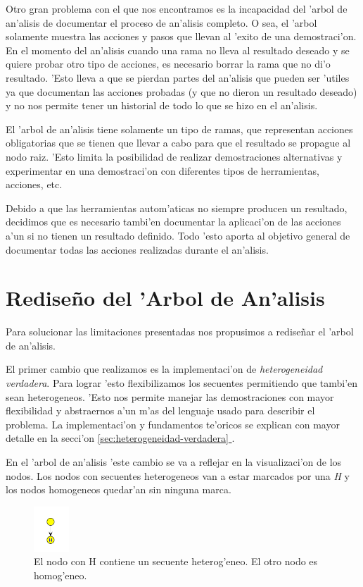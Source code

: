 Otro gran problema con el que nos encontramos es la incapacidad del 'arbol de an'alisis de documentar el proceso de an'alisis completo. O sea, el 'arbol solamente muestra las acciones y pasos que llevan al 'exito de una demostraci'on. En el momento del an'alisis cuando una rama no lleva al resultado deseado y se quiere probar otro tipo de acciones, es necesario borrar la rama que no di'o resultado. 'Esto lleva a que se pierdan partes del an'alisis que pueden ser 'utiles ya que documentan las acciones probadas (y que no dieron un resultado deseado) y no nos permite tener un historial de todo lo que se hizo en el an'alisis.

El 'arbol de an'alisis tiene solamente un tipo de ramas, que representan acciones obligatorias que se tienen que llevar a cabo para que el resultado se propague al nodo raiz. 'Esto limita la posibilidad de realizar demostraciones alternativas y experimentar en una demostraci'on con diferentes tipos de herramientas, acciones, etc.

Debido a que las herramientas autom'aticas no siempre producen un resultado, decidimos que es necesario tambi'en documentar la aplicaci'on de las acciones a'un si no tienen un resultado definido.   Todo 'esto aporta al objetivo general de documentar todas las acciones realizadas durante el an'alisis.


\section{Rediseño del 'Arbol de An'alisis}

Para solucionar las limitaciones presentadas nos propusimos a rediseñar el 'arbol de an'alisis.

El primer cambio que realizamos es la implementaci'on de \textit{heterogeneidad verdadera}.
Para lograr 'esto flexibilizamos los secuentes permitiendo que tambi'en sean heterogeneos. 'Esto nos permite manejar las demostraciones con mayor flexibilidad y abstraernos a'un m'as del lenguaje usado para describir el problema. La implementaci'on y fundamentos te'oricos se explican con mayor detalle en la secci'on \hyperref[sec:heterogeneidad-verdadera]{\ref*{sec:heterogeneidad-verdadera} }.

En el 'arbol de an'alisis 'este cambio se va a reflejar en la visualizaci'on de los nodos. Los nodos con secuentes heterogeneos van a estar marcados por una \textit{H} y los nodos homogeneos quedar'an sin ninguna marca.

\begin{figure}[H]
	\includegraphics[width=50px]{img/hetero_homo.png}
	\centering
	\caption{El nodo con H contiene un secuente heterog'eneo. El otro nodo es homog'eneo.}
\end{figure}

